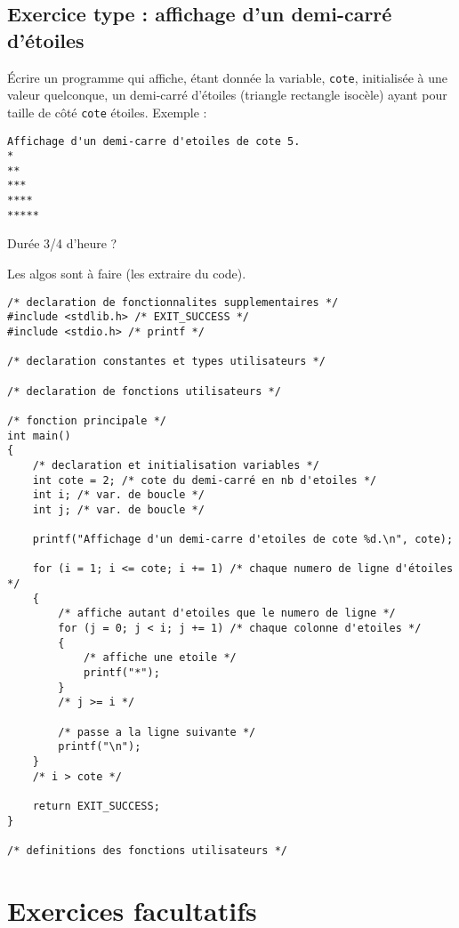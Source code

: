 \subsection{Exercice type : affichage d'un demi-carré d'étoiles}

Écrire un programme  qui affiche, étant donnée la variable,
\verb|cote|, initialisée à une valeur quelconque, un demi-carré d'étoiles (triangle rectangle isocèle) ayant pour
taille de côté \verb|cote| étoiles. Exemple :
\begin{verbatim}
Affichage d'un demi-carre d'etoiles de cote 5.
*
**
***
****
*****
\end{verbatim}

\begin{correction}
Durée 3/4 d'heure ?

Les algos sont à faire (les extraire du code).

\begin{verbatim}
/* declaration de fonctionnalites supplementaires */
#include <stdlib.h> /* EXIT_SUCCESS */
#include <stdio.h> /* printf */

/* declaration constantes et types utilisateurs */

/* declaration de fonctions utilisateurs */

/* fonction principale */
int main()
{
    /* declaration et initialisation variables */
    int cote = 2; /* cote du demi-carré en nb d'etoiles */
    int i; /* var. de boucle */
    int j; /* var. de boucle */

    printf("Affichage d'un demi-carre d'etoiles de cote %d.\n", cote);

    for (i = 1; i <= cote; i += 1) /* chaque numero de ligne d'étoiles */
    {
        /* affiche autant d'etoiles que le numero de ligne */
        for (j = 0; j < i; j += 1) /* chaque colonne d'etoiles */
        {
            /* affiche une etoile */
            printf("*");
        }
        /* j >= i */

        /* passe a la ligne suivante */
        printf("\n");
    }
    /* i > cote */

    return EXIT_SUCCESS;
}

/* definitions des fonctions utilisateurs */
\end{verbatim}
\end{correction}

\section{Exercices facultatifs}
